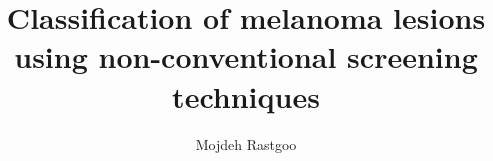 \makeatletter
	\setlength{\@fptop}{0pt}
\makeatother

\newcommand{\showcounter}{\stepcounter{tableRow}\arabic{tableRow}}


%
%

\title{Classification of melanoma lesions using non-conventional screening techniques}
\author{Mojdeh Rastgoo}


\renewcommand{\submittedtext}{Work submitted to the University of Girona in partial fulfillment of the requirements for the degree of Doctor of Philosophy}

\hfuzz=50pt

\usepackage{latex/filesystem/watermark}

\onehalfspacing

%
%
%
%
%
